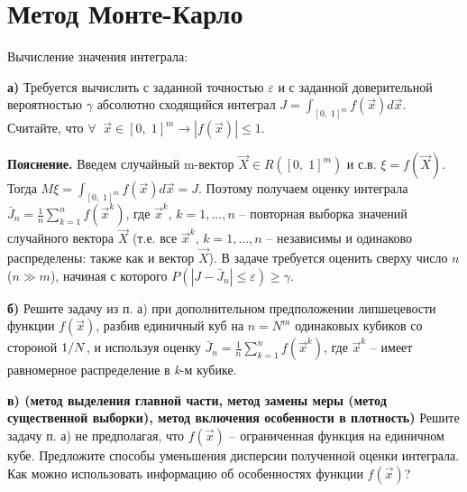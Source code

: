 \section{Метод Монте-Карло}

\begin{problem}
Вычисление значения интеграла:

 \textbf{а)} Требуется вычислить с заданной точностью $\varepsilon $ и с заданной доверительной вероятностью $\gamma $ абсолютно сходящийся интеграл $J=\int _{\left[0,\; 1\right]^{m} }f\left(\vec{x}\right)d\vec{x} $. Считайте, что $\forall \; \; \vec{x}\in \left[0,\; 1\right]^{m} \to \left|f\left(\vec{x}\right)\right|\le 1$.

\noindent \textbf{Пояснение. }Введем случайный m-вектор $\vec{X}\in R\left(\left[0,\; 1\right]^{m} \right)$ и с.в. $\xi =f\left(\vec{X}\right)$. Тогда $M\xi =\int _{\left[0,\; 1\right]^{m} }f\left(\vec{x}\right)d\vec{x} =J$. Поэтому получаем оценку интеграла $\bar{J}_{n} =\frac{1}{n} \sum _{k=1}^{n}f\left(\vec{x}^{k} \right) $, где $\vec{x}^{k} $, $k=1,...,n$ -- повторная выборка значений случайного вектора $\vec{X}$ (т.е. все $\vec{x}^{k} $, $k=1,...,n$ -- независимы и одинаково распределены: также как и вектор $\vec{X}$). В задаче требуется оценить сверху число $n$ ($n\gg m$), начиная с которого $P\left(\left|J-\bar{J}_{n} \right|\le \varepsilon \right)\ge \gamma $.

\textbf{б) }Решите задачу из п. а) при дополнительном предположении липшецевости функции $f\left(\vec{x}\right)$, разбив единичный куб на $n=N^{m} $ одинаковых кубиков со стороной ${1\mathord{\left/ {\vphantom {1 N}} \right. \kern-\nulldelimiterspace} N} $, и используя оценку $\bar{J}_{n} =\frac{1}{n} \sum _{k=1}^{n}f\left(\vec{x}^{k} \right) $, где $\vec{x}^{k} $ -- имеет равномерное распределение в \textit{k}-м кубике.

\textbf{в) (метод выделения главной части, метод замены меры (метод существенной выборки), метод включения особенности в плотность) }Решите задачу п. а) не предполагая, что $f\left(\vec{x}\right)$ -- ограниченная функция на единичном кубе. Предложите способы уменьшения дисперсии полученной оценки интеграла. Как можно использовать информацию об особенностях функции $f\left(\vec{x}\right)$?

\end{problem}